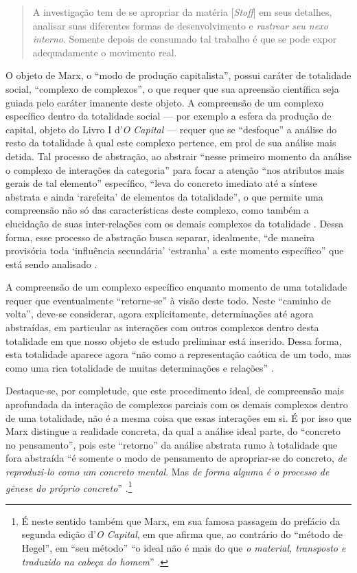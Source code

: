 \begin{quote}
A investigação tem de se apropriar da matéria {[}\emph{Stoff}{]} em seus detalhes, analisar suas diferentes formas de desenvolvimento e \emph{rastrear seu nexo interno}. Somente depois de consumado tal trabalho é que se pode expor adequadamente o movimento real. \parencite[p. 90, grifo meu]{Marx2017}
\end{quote}

O objeto de Marx, o ``modo de produção capitalista'', possui caráter de totalidade social, ``complexo de complexos'', o que requer que sua apreensão científica seja guiada pelo caráter imanente deste objeto. A compreensão de um complexo específico dentro da totalidade social --- por exemplo a esfera da produção de capital, objeto do Livro I d'\emph{O Capital} --- requer que se ``desfoque'' a análise do resto da totalidade à qual este complexo pertence, em prol de sua análise mais detida. Tal processo de abstração, ao abstrair ``nesse primeiro momento da análise o complexo de interações da categoria'' para focar a atenção ``nos atributos mais gerais de tal elemento'' específico, ``leva do concreto imediato até a síntese abstrata e ainda `rarefeita' de elementos da totalidade'', o que permite uma compreensão não só das características deste complexo, como também a elucidação de suas inter-relações com os demais complexos da totalidade \parencite[p. 138]{Fortes2013}. Dessa forma, esse processo de abstração busca separar, idealmente, ``de maneira provisória toda `influência secundária' `estranha' a este momento específico'' que está sendo analisado \parencite[p. 60]{Fortes2016a}.

A compreensão de um complexo específico enquanto momento de uma totalidade requer que eventualmente ``retorne-se'' à visão deste todo. Neste ``caminho de volta'', deve-se considerar, agora explicitamente, determinações até agora abstraídas, em particular as interações com outros complexos dentro desta totalidade em que nosso objeto de estudo preliminar está inserido. Dessa forma, esta totalidade aparece agora ``não como a representação caótica de um todo, mas como uma rica totalidade de muitas determinações e relações'' \parencite[p. 54]{Marx2011}.

Destaque-se, por completude, que este procedimento ideal, de compreensão mais aprofundada da interação de complexos parciais com os demais complexos dentro de uma totalidade, não é a mesma coisa que essas interações em si. É por isso que Marx distingue a realidade concreta, da qual a análise ideal parte, do ``concreto no pensamento'', pois este ``retorno'' da análise abstrata rumo à totalidade que fora abstraída ``é somente o modo de pensamento de apropriar-se do concreto, \emph{de reproduzi-lo como um concreto mental}. Mas \emph{de forma alguma é o processo de gênese do próprio concreto}'' \parencite[p. 54-5, grifo meu]{Marx2011}.\footnote{É neste sentido também que Marx, em sua famosa passagem do prefácio da segunda edição d'\emph{O Capital}, em que afirma que, ao contrário do ``método de Hegel'', em ``seu método'' ``o ideal não é mais do que \emph{o material, transposto e traduzido na cabeça do homem}'' \parencite[p. 90, grifo meu]{Marx2017}.}


